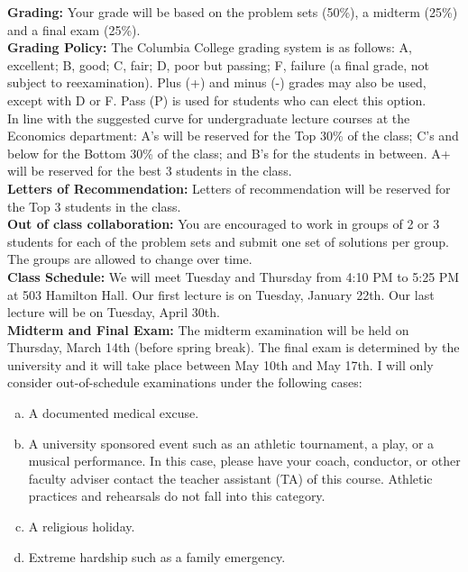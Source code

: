 \documentclass[12pt]{article} %
\numberwithin{equation}{section}
\theoremstyle{definition}
\newcommand{\0}{\textbf{0}}                          %
\begin{document}
\noindent \textbf{Grading:} Your grade will be based on the problem sets (50\%), a midterm (25\%) and a final exam (25\%).\\

\noindent \textbf{Grading Policy:} The Columbia College grading system is as follows: A, excellent; B, good; C, fair; D, poor but passing; F, failure (a final grade, not subject to reexamination). Plus (+) and minus (-) grades may also be used, except with D or F. Pass (P) is used for students who can elect this option.\\

In line with the suggested curve for undergraduate lecture courses at the Economics department: A\textquoteright s will be reserved for the Top 30\% of the class; C\textquoteright s and below for the Bottom 30\% of the class; and B\textquoteright s for the students in between. A+ will be reserved for the best 3 students in the class. \\
 
 \noindent \textbf{Letters of Recommendation:} Letters of recommendation will be reserved for the Top 3 students in the class. \\

\noindent \textbf{Out of class collaboration:} You are encouraged to work in groups of 2 or 3 students for each of the problem sets and submit one set of solutions per group. The groups are allowed to change over time.  \\ 

\noindent \textbf{Class Schedule:} We will meet Tuesday and Thursday from 4:10 PM to 5:25 PM at 503 Hamilton Hall. Our first lecture is on Tuesday, January 22th. Our last lecture will be on Tuesday, April 30th.\\


\noindent \textbf{Midterm and Final Exam:}  The midterm examination will be held on Thursday, March 14th (before spring break). The final exam is determined by the university and it will take place between May 10th and May 17th. I will only consider out-of-schedule examinations under the following cases:

\begin{enumerate}[a)]
\item A documented medical excuse.
\item A university sponsored event such as an athletic tournament, a play, or a musical performance. In this case, please have your coach, conductor, or other faculty adviser contact the teacher assistant (TA) of this course. Athletic practices and rehearsals do not fall into this category. 

\item A religious holiday.

\item Extreme hardship such as a family emergency.

\end{enumerate}
\end{document}
